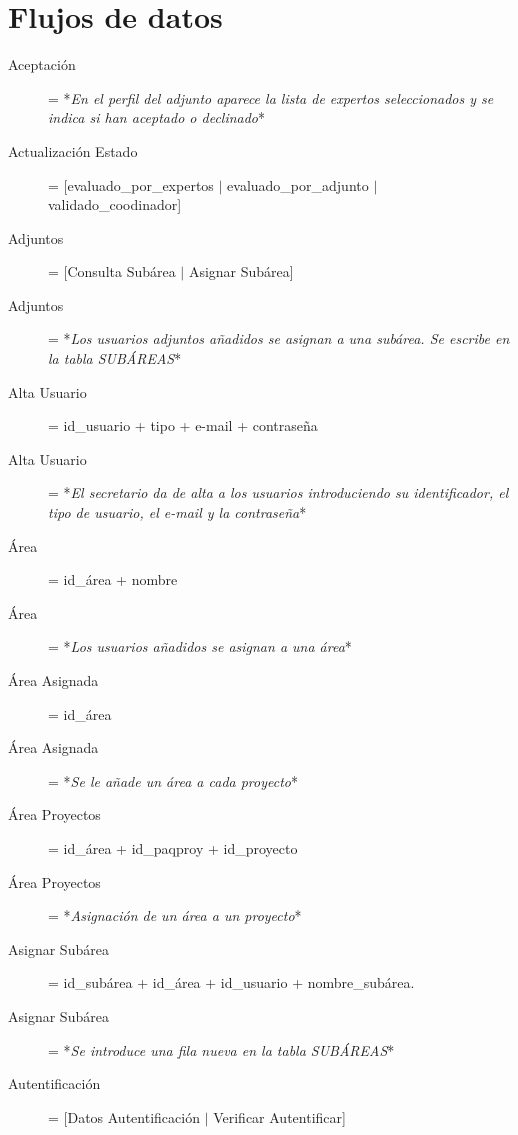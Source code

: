 \documentclass[12pt,a4paper,spanish,twoside]{book}
\begin{document}
\section{Flujos de datos}
\begin{description}
\item[Aceptación] = *\emph{En el perfil del adjunto aparece la lista de
    expertos seleccionados y se indica si han aceptado o declinado}* 

\item[Actualización Estado] = [evaluado\_por\_expertos $\mid$
  evaluado\_por\_adjunto $\mid$ validado\_coodinador] 

\item[Adjuntos] = [Consulta Subárea $\mid$ Asignar Subárea]

\item[Adjuntos] = *\emph{Los usuarios adjuntos añadidos se asignan a una
    subárea. Se escribe en la tabla SUBÁREAS}* 
 
\item[Alta Usuario] = id\_usuario + tipo + e-mail + contraseña

\item[Alta Usuario] = *\emph{El secretario da de alta a los usuarios
    introduciendo su identificador, el tipo de usuario, el e-mail y la
    contraseña}* 

\item[Área] = id\_área + nombre

\item[Área] = *\emph{Los usuarios añadidos se asignan a una área}*

\item[Área Asignada] = id\_área

\item[Área Asignada] = *\emph{Se le añade un área a cada proyecto}*

\item[Área Proyectos] = id\_área + id\_paqproy + id\_proyecto

\item[Área Proyectos] = *\emph{Asignación de un área a un proyecto}*

\item[Asignar Subárea] = id\_subárea + id\_área + id\_usuario + nombre\_subárea.

\item[Asignar Subárea] = *\emph{Se introduce una fila nueva en la tabla
    SUBÁREAS}* 

\item[Autentificación] = [Datos Autentificación $\mid$ Verificar Autentificar]


\end{description}
\end{document}
